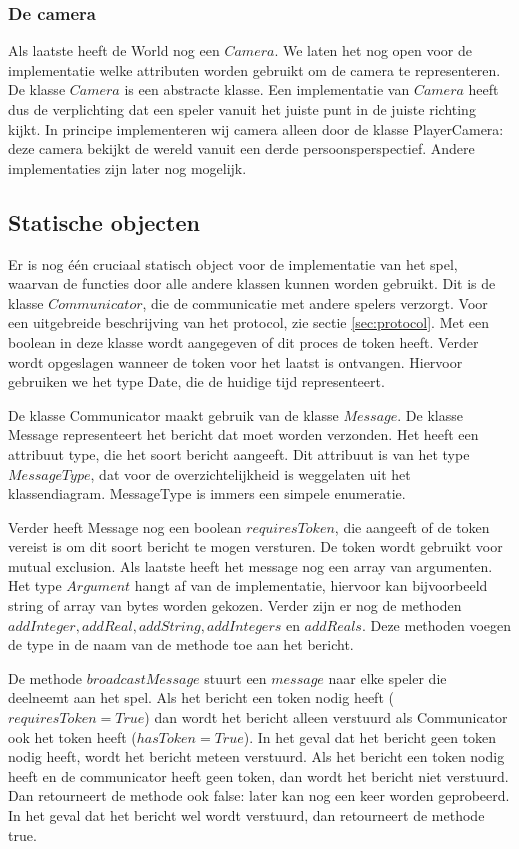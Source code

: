 \documentclass[a4paper,11pt, twoside]{article}
\newcommand{\protoref}{sectie \ref{sec:protocol}}
\begin{document}
\subsubsection{De camera}
Als laatste heeft de World nog een $Camera$. We laten het nog open voor de implementatie welke attributen worden gebruikt om de camera te representeren. De klasse $Camera$ is een abstracte klasse. Een implementatie van $Camera$ heeft dus de verplichting dat een speler vanuit het juiste punt in de juiste richting kijkt. In principe implementeren wij camera alleen door de klasse PlayerCamera: deze camera bekijkt de wereld vanuit een derde persoonsperspectief. Andere implementaties zijn later nog mogelijk.

\subsection{Statische objecten}
Er is nog \'e\'en cruciaal statisch object voor de implementatie van het spel, waarvan de functies door alle andere klassen kunnen worden gebruikt. Dit is de klasse $Communicator$, die de communicatie met andere spelers verzorgt.  Voor een uitgebreide beschrijving van het protocol, zie \protoref. Met een boolean in deze klasse wordt aangegeven of dit proces de token heeft. Verder wordt opgeslagen wanneer de token voor het laatst is ontvangen. Hiervoor gebruiken we het type Date, die de huidige tijd representeert.

De klasse Communicator maakt gebruik van de klasse $Message$. De klasse Message representeert het bericht dat moet worden verzonden. Het heeft een attribuut type, die het soort bericht aangeeft. Dit attribuut is van het type $MessageType$, dat voor de overzichtelijkheid is weggelaten uit het klassendiagram. MessageType is immers een simpele enumeratie.

Verder heeft Message nog een boolean $requiresToken$, die aangeeft of de token vereist is om dit soort bericht te mogen versturen. De token wordt gebruikt voor mutual exclusion. Als laatste heeft het message nog een array van argumenten. Het type $Argument$ hangt af van de implementatie, hiervoor kan bijvoorbeeld string of array van bytes worden gekozen. Verder zijn er nog de methoden $addInteger, addReal, addString, addIntegers$ en $addReals$. Deze methoden voegen de type in de naam van de methode toe aan het bericht.

De methode $broadcastMessage$ stuurt een $message$ naar elke speler die deelneemt aan het spel. Als het bericht een token nodig heeft ($requiresToken = True$) dan wordt het bericht alleen verstuurd als Communicator ook het token heeft ($hasToken = True$). In het geval dat het bericht geen token nodig heeft, wordt het bericht meteen verstuurd. Als het bericht een token nodig heeft en de communicator heeft geen token, dan wordt het bericht niet verstuurd. Dan retourneert de methode ook false: later kan nog een keer worden geprobeerd. In het geval dat het bericht wel wordt verstuurd, dan retourneert de methode true.
\end{document}
